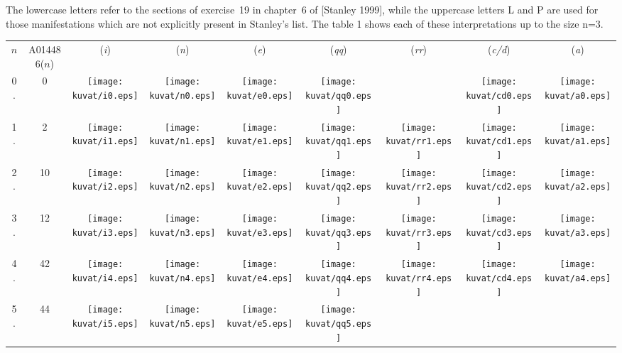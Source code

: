 \documentclass[11pt]{article} %
\newcommand{\catint}[1]{({\it #1})}
\begin{document}
The lowercase letters refer to the sections of exercise~19 in
chapter~6 of [Stanley 1999],
while the uppercase letters L and P
are used for those manifestations which are not explicitly present
in Stanley's list.
The table 1 shows each of these interpretations up to the size n=3.

\begin{table}[htbp]
\setlength{\extrarowheight}{0.3in}
\begin{tabular}{c c c c c c c c c}
$n$ & A014486($n$) & \catint{i} & \catint{n} & \catint{e} & \catint{qq} & \catint{rr} & \catint{c/d} & \catint{a} \\
0. \vspace{0.1in} & 0 & \texttt{[image: kuvat/i0.eps]} & \texttt{[image: kuvat/n0.eps]}
 & \texttt{[image: kuvat/e0.eps]} & \texttt{[image: kuvat/qq0.eps]}
 & & \texttt{[image: kuvat/cd0.eps]} & \texttt{[image: kuvat/a0.eps]}\\ \hline
1. \vspace{0.1in} & 2 & \texttt{[image: kuvat/i1.eps]} & \texttt{[image: kuvat/n1.eps]}
 & \texttt{[image: kuvat/e1.eps]} & \texttt{[image: kuvat/qq1.eps]}
 & \texttt{[image: kuvat/rr1.eps]}
 & \texttt{[image: kuvat/cd1.eps]} & \texttt{[image: kuvat/a1.eps]}\\ \hline
2. \vspace{0.1in} & 10 & \texttt{[image: kuvat/i2.eps]} & \texttt{[image: kuvat/n2.eps]}
 & \texttt{[image: kuvat/e2.eps]} & \texttt{[image: kuvat/qq2.eps]}
 & \texttt{[image: kuvat/rr2.eps]}
 & \texttt{[image: kuvat/cd2.eps]} & \texttt{[image: kuvat/a2.eps]}\\
3. \vspace{0.1in} & 12 & \texttt{[image: kuvat/i3.eps]} & \texttt{[image: kuvat/n3.eps]}
 & \texttt{[image: kuvat/e3.eps]} & \texttt{[image: kuvat/qq3.eps]}
 & \texttt{[image: kuvat/rr3.eps]}
 & \texttt{[image: kuvat/cd3.eps]} & \texttt{[image: kuvat/a3.eps]}\\ \hline
4. \vspace{0.1in} & 42 & \texttt{[image: kuvat/i4.eps]} & \texttt{[image: kuvat/n4.eps]}
 & \texttt{[image: kuvat/e4.eps]} & \texttt{[image: kuvat/qq4.eps]}
 & \texttt{[image: kuvat/rr4.eps]}
 & \texttt{[image: kuvat/cd4.eps]} & \texttt{[image: kuvat/a4.eps]}\\
5. \vspace{0.1in} & 44 & \texttt{[image: kuvat/i5.eps]} & \texttt{[image: kuvat/n5.eps]}
 & \texttt{[image: kuvat/e5.eps]} & \texttt{[image: kuvat/qq5.eps]}

\end{tabular}
\end{table}
\end{document}
